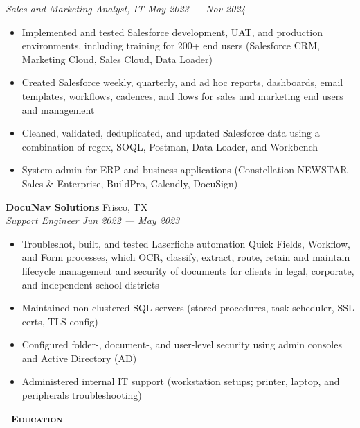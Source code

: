 \documentclass[a4paper,11pt]{article}
\newcommand{\header} [1] {
    \vspace{1mm}
    {\textsc{\textbf{\Large{\xrfill[0.5ex]{0.5pt}~#1~\xrfill[0.5ex]{0.5pt}}}}} %
}
\begin{document}
\textit{Sales and Marketing Analyst, IT} \hfill  \textit{May 2023 --- Nov 2024} 
\begin{itemize}
    \item Implemented and tested Salesforce development, UAT, and production environments, including training for 200+ end users (Salesforce CRM, Marketing Cloud, Sales Cloud, Data Loader) 
    \item Created Salesforce weekly, quarterly, and ad hoc reports, dashboards, email templates, workflows, cadences, and flows for sales and marketing end users and management
    \item Cleaned, validated, deduplicated, and updated Salesforce data using a combination of regex, SOQL, Postman, Data Loader, and Workbench
    \item System admin for ERP and business applications (Constellation NEWSTAR Sales \& Enterprise, BuildPro, Calendly, DocuSign)
\end{itemize}
\vspace{1mm}

\textbf{DocuNav Solutions} \hfill Frisco, TX \\
\textit{Support Engineer} \hfill  \textit{Jun 2022 --- May 2023} 
\begin{itemize}
    \item Troubleshot, built, and tested Laserfiche automation Quick Fields, Workflow, and Form processes, which OCR, classify, extract, route, retain and maintain lifecycle management and security of documents for clients in legal, corporate, and independent school districts
    \item Maintained non-clustered SQL servers (stored procedures, task scheduler, SSL certs, TLS config)
    \item Configured folder-, document-, and user-level security using admin consoles and Active Directory (AD)
    \item Administered internal IT support (workstation setups; printer, laptop, and peripherals troubleshooting)
\end{itemize}    
\vspace{1mm}


\header{Education} 
\end{document}

